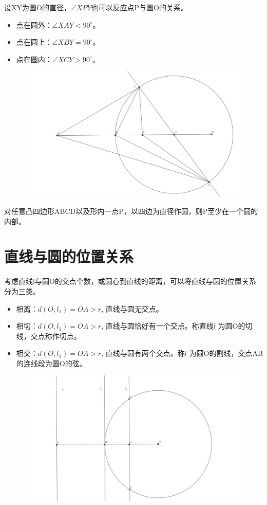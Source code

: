 设XY为圆O的直径，$\angle XPY$也可以反应点P与圆O的关系。
\begin{itemize}
    \item 点在圆外：$\angle XAY< 90^\circ$。
    \item 点在圆上：$\angle XBY= 90^\circ$。
    \item 点在圆内：$\angle XCY > 90^\circ$。
\end{itemize}
\begin{figure}[H]
    \centering
    \includegraphics[width=0.8\linewidth]{figures/点与圆2.png}
\end{figure}

\begin{example}
    对任意凸四边形ABCD以及形内一点P，以四边为直径作圆，则P至少在一个圆的内部。
\end{example}


\newpage 
\section{直线与圆的位置关系}
考虑直线l与圆O的交点个数，或圆心到直线的距离，可以将直线与圆的位置关系分为三类。
\begin{itemize}
    \item 相离：$d(O,l_1)=OA > r$, 直线与圆无交点。
    \item 相切：$d(O,l_1)=OA > r$, 直线与圆恰好有一个交点。称直线$l$ 为圆O的切线，交点称作切点。
    \item 相交：$d(O,l_1)=OA > r$, 直线与圆有两个交点。称$l$ 为圆O的割线，交点AB的连线段为圆O的弦。
\end{itemize}
\begin{figure}[H]
    \centering
    \includegraphics[width=0.8\linewidth]{figures/直线与圆.png}
\end{figure}




